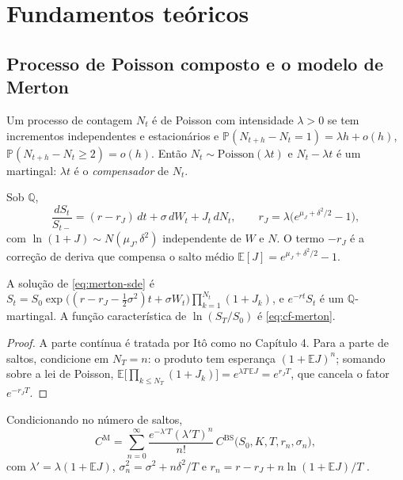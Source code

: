 \section{Fundamentos teóricos}

\subsection{Processo de Poisson composto e o modelo de Merton}

\begin{definicao}
Um processo de contagem $N_t$ é de Poisson com intensidade $\lambda>0$ se tem incrementos independentes e estacionários e $\mathbb P(N_{t+h}-N_t=1)=\lambda h+o(h)$, $\mathbb P(N_{t+h}-N_t\ge2)=o(h)$. Então $N_t\sim\mathrm{Poisson}(\lambda t)$ e $N_t-\lambda t$ é um martingal: $\lambda t$ é o \emph{compensador} de $N_t$.
\end{definicao}

\begin{definicao}
Sob $\mathbb Q$,
\begin{equation}\label{eq:merton-sde}
\frac{dS_t}{S_{t-}}=(r-r_J)\,dt+\sigma\,dW_t+J_t\,dN_t,\qquad r_J=\lambda\big(e^{\mu_J+\delta^2/2}-1\big),
\end{equation}
com $\ln(1+J)\sim N(\mu_J,\delta^2)$ independente de $W$ e $N$. O termo $-r_J$ é a correção de deriva que compensa o salto médio $\mathbb E[J]=e^{\mu_J+\delta^2/2}-1$.
\end{definicao}

\begin{proposicao}
A solução de \eqref{eq:merton-sde} é $S_t=S_0\exp\big((r-r_J-\tfrac12\sigma^2)t+\sigma W_t\big)\prod_{k=1}^{N_t}(1+J_k)$, e $e^{-rt}S_t$ é um $\mathbb Q$-martingal. A função característica de $\ln(S_T/S_0)$ é \eqref{eq:cf-merton}.
\end{proposicao}

\begin{proof}
A parte contínua é tratada por Itô como no Capítulo 4. Para a parte de saltos, condicione em $N_T=n$: o produto tem esperança $(1+\mathbb E J)^n$; somando sobre a lei de Poisson, $\mathbb E\big[\prod_{k\le N_T}(1+J_k)\big]=e^{\lambda T\,\mathbb E J}=e^{r_JT}$, que cancela o fator $e^{-r_JT}$.
\end{proof}

\begin{proposicao}
Condicionando no número de saltos,
\begin{equation}
C^{\mathrm{M}}=\sum_{n=0}^\infty\frac{e^{-\lambda'T}(\lambda'T)^n}{n!}\,C^{\mathrm{BS}}\big(S_0,K,T,r_n,\sigma_n\big),
\end{equation}
com $\lambda'=\lambda(1+\mathbb EJ)$, $\sigma_n^2=\sigma^2+n\delta^2/T$ e $r_n=r-r_J+n\ln(1+\mathbb EJ)/T$ \citep{merton1976}.
\end{proposicao}

